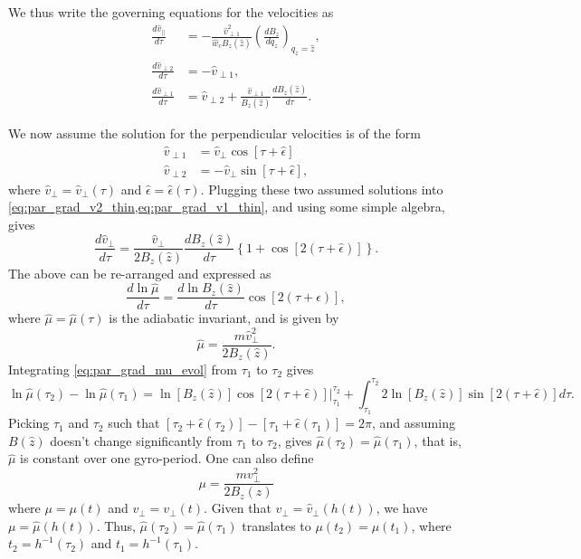 \documentclass[a4paper,11pt]{report}
\begin{document}
We thus write the governing equations for the velocities as
\begin{align}
    \frac{d\hat{v}_{||}}{d\tau} &= -\frac{\hat{v}^2_{\perp1}}{\hat{w}_c B_z(\hat{z})} \left ( \frac{dB_z}{dq_z} \right )_{q_z = \hat{z}} ,\label{eq:par_grad_vpar_thin}\\
    \frac{d\hat{v}_{\perp2}}{d\tau} &= -\hat{v}_{\perp1}, \label{eq:par_grad_v2_thin} \\
    \frac{d\hat{v}_{\perp1}}{d\tau} &= \hat{v}_{\perp2} + \frac{\hat{v}_{\perp1}}{B_z(\hat{z})} \frac{dB_z(\hat{z})}{d\tau}. \label{eq:par_grad_v1_thin}
\end{align}

We now assume the solution for the perpendicular velocities is of the form
\begin{align}
    \hat{v}_{\perp1} &= \hat{v}_\perp \cos [\tau + \hat{\epsilon}] \\
    \hat{v}_{\perp2} &= -\hat{v}_\perp \sin [\tau + \hat{\epsilon}],
\end{align}
where $\hat{v}_\perp = \hat{v}_\perp(\tau)$ and $\hat{\epsilon} = \hat{\epsilon}(\tau)$. Plugging these two assumed solutions into \cref{eq:par_grad_v2_thin,eq:par_grad_v1_thin}, and using some simple algebra, gives
\begin{equation}
    \frac{d\hat{v}_\perp}{d\tau} = \frac{\hat{v}_\perp}{2 B_z(\hat{z})} \frac{dB_z(\hat{z})}{d\tau} \left \{ 1 + \cos [2 (\tau + \hat{\epsilon})] \right \}.
\end{equation}
The above can be re-arranged and expressed as
\begin{equation}
\label{eq:par_grad_mu_evol}
    \frac{d \ln \hat{\mu}}{d\tau} = \frac{d \ln B_z(\hat{z}) }{d\tau} \cos [2 (\tau + \hat{\epsilon})],
\end{equation}
where $\hat{\mu} = \hat{\mu}(\tau)$ is the adiabatic invariant, and is given by
\begin{equation}
    \hat{\mu} = \frac{m \hat{v}^2_\perp}{2 B_z(\hat{z})}.
\end{equation}
Integrating \cref{eq:par_grad_mu_evol} from $\tau_1$ to $\tau_2$ gives
\begin{equation}
    \ln \hat{\mu}(\tau_2) - \ln \hat{\mu}(\tau_1) = \left . \ln [B_z(\hat{z})] \cos [2(\tau + \hat{\epsilon})] \right |^{\tau_2}_{\tau_1} + \int_{\tau_1}^{\tau_2} 2 \ln [ B_z(\hat{z}) ] \sin [2(\tau + \hat{\epsilon})] d\tau.
\end{equation}
Picking $\tau_1$ and $\tau_2$ such that $[\tau_2 + \hat{\epsilon}(\tau_2)] - [\tau_1 + \hat{\epsilon}(\tau_1)] = 2 \pi$, and assuming $B(\hat{z})$ doesn't change significantly from $\tau_1$ to $\tau_2$, gives $\hat{\mu}(\tau_2) = \hat{\mu}(\tau_1)$, that is, $\hat{\mu}$ is constant over one gyro-period. One can also define
\begin{equation}
    \mu = \frac{m v_\perp^2}{2B_z(z)}
\end{equation}
where $\mu = \mu(t)$ and $v_\perp = v_\perp(t)$. Given that $v_\perp = \hat{v}_\perp(h(t))$, we have $\mu = \hat{\mu}(h(t))$. Thus, $\hat{\mu}(\tau_2) = \hat{\mu}(\tau_1)$ translates to $\mu(t_2) = \mu(t_1)$, where $t_2 = h^{-1}(\tau_2)$ and $t_1 = h^{-1}(\tau_1)$.
\end{document}
